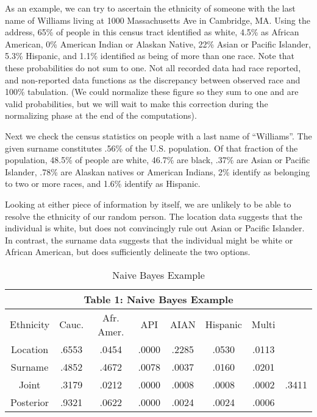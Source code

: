 \par As an example, we can try to ascertain the ethnicity of someone with the last name of Williams living at 1000 Massachusetts Ave in Cambridge, MA.  Using the address, 65\% of people in this census tract identified as white, 4.5\% as African American, 0\% American Indian or Alaskan Native, 22\% Asian or Pacific Islander, 5.3\% Hispanic, and 1.1\% identified as being of more than one race.  Note that these probabilities do not sum to one.  Not all recorded data had race reported, and non-reported data functions as the discrepancy between observed race and 100\% tabulation.  (We could normalize these figure so they sum to one and are valid probabilities, but we will wait to make this correction during the normalizing phase at the end of the computations).

\par Next we check the census statistics on people with a last name of “Williams”.  The given surname constitutes .56\% of the U.S. population.  Of that fraction of the population, 48.5\% of people are white, 46.7\% are black, .37\% are Asian or Pacific Islander, .78\% are Alaskan natives or American Indians, 2\% identify as belonging to two or more races, and 1.6\% identify as Hispanic.

\par Looking at either piece of information by itself, we are unlikely to be able to resolve the ethnicity of our random person.  The location data suggests that the individual is white, but does not convincingly rule out Asian or Pacific Islander.  In contrast, the surname data suggests that the individual might be white or African American, but does sufficiently delineate the two options.

\begin{table}
\centering
 \begin{tabular}{|c c c c c c c c|}
 \multicolumn{8}{c}{Table 1: Naive Bayes Example} \\
 \hline
  Ethnicity & Cauc. & Afr. Amer. & API & AIAN &Hispanic & Multi&\\ [0.5ex] 
 \hline
 Location &.6553 &.0454 &.0000 &.2285 &.0530 &.0113&  \\ 
 \hline
 Surname &.4852 &.4672 &.0078 &.0037 &.0160 &.0201&  \\
 \hline
 Joint &.3179 &.0212 &.0000 &.0008 &.0008 &.0002&.3411  \\
 \hline
 Posterior &.9321 &.0622 &.0000 &.0024 &.0024 &.0006 &  \\
 \hline
\end{tabular}
\caption{Naive Bayes Example}
\label{tab:table1}
\end{table}

